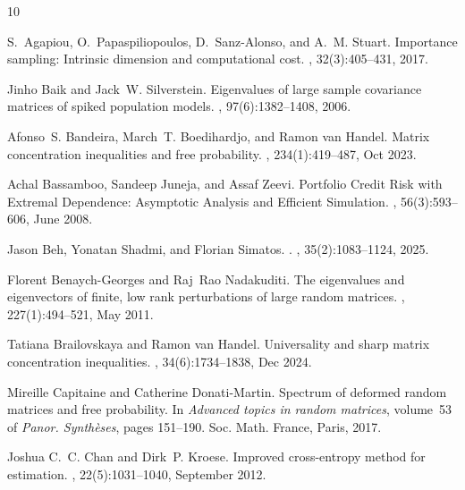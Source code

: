 \documentclass[]{article}
\theoremstyle{plain}
\theoremstyle{definition}
\begin{document}
\begin{thebibliography}{10}

S.~Agapiou, O.~Papaspiliopoulos, D.~Sanz-Alonso, and A.~M. Stuart.
\newblock Importance sampling: Intrinsic dimension and computational cost.
, 32(3):405--431, 2017.

Jinho Baik and Jack~W. Silverstein.
\newblock Eigenvalues of large sample covariance matrices of spiked population
  models.
, 97(6):1382--1408, 2006.

Afonso~S. Bandeira, March~T. Boedihardjo, and Ramon van Handel.
\newblock Matrix concentration inequalities and free probability.
, 234(1):419--487, Oct 2023.

Achal Bassamboo, Sandeep Juneja, and Assaf Zeevi.
\newblock Portfolio {Credit} {Risk} with {Extremal} {Dependence}: {Asymptotic}
  {Analysis} and {Efficient} {Simulation}.
, 56(3):593--606, June 2008.

Jason Beh, Yonatan Shadmi, and Florian Simatos.
.
, 35(2):1083--1124, 2025.

Florent Benaych-Georges and Raj~Rao Nadakuditi.
\newblock The eigenvalues and eigenvectors of finite, low rank perturbations of
  large random matrices.
, 227(1):494--521, May 2011.

Tatiana Brailovskaya and Ramon van Handel.
\newblock Universality and sharp matrix concentration inequalities.
, 34(6):1734--1838, Dec 2024.

Mireille Capitaine and Catherine Donati-Martin.
\newblock Spectrum of deformed random matrices and free probability.
\newblock In {\em Advanced topics in random matrices}, volume~53 of {\em Panor.
  Synth\`eses}, pages 151--190. Soc. Math. France, Paris, 2017.

Joshua C.~C. Chan and Dirk~P. Kroese.
\newblock Improved cross-entropy method for estimation.
, 22(5):1031--1040, September 2012.


\end{thebibliography}
\end{document}
